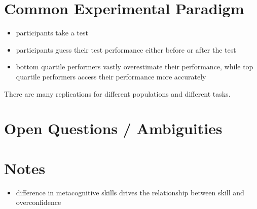 \documentclass[a4paper,11pt]{article}
\newcommand{\1}{\mathbf{1}}
\begin{document}
\section{Common Experimental Paradigm}
\begin{itemize}
 \item participants take a test
 \item participants guess their test performance either before or after the test
 \item bottom quartile performers vastly overestimate their performance, while top quartile performers access their performance more accurately
\end{itemize}

There are many replications for different populations and different tasks.

\section{Open Questions / Ambiguities}

\section{Notes}
\begin{itemize}
 \item difference in metacognitive skills drives the relationship between skill and overconfidence
\end{itemize}
\end{document}
